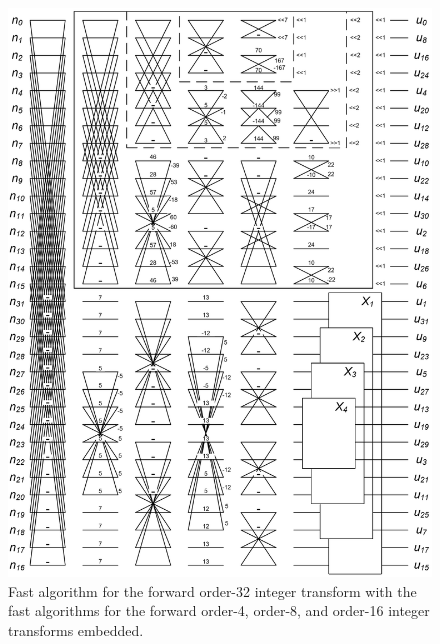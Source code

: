 \begin{figure}[h!]
     	\centering	
     	\includegraphics[width=\textwidth]{imm/dct/dct_2n.png}  
     	\caption{ Fast algorithm for the forward order-32 integer transform with the fast algorithms for the forward order-4, order-8, and order-16 integer transforms embedded. } 
     	\label{dct32}
\end{figure}  

\clearpage        
